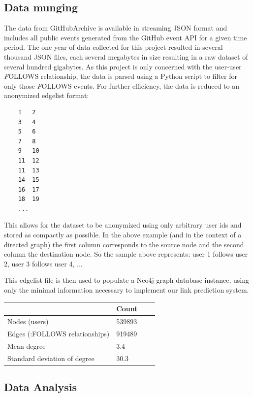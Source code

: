 \subsection{Data munging}
The data from GitHubArchive is available in streaming JSON format and includes all public events generated from the GitHub event API \cite{github:Online} for a given time period. The one year of data collected for this project resulted in several thousand JSON files, each several megabytes in size resulting in a raw dataset of several hundred gigabytes. As this project is only concerned with the user-user {\textit FOLLOWS} relationship, the data is parsed using a Python script to filter for only those {\textit FOLLOWS} events. For further efficiency, the data is reduced to an anonymized edgelist format:
\begin{verbatim}
    1	2
    3	4
    5	6
    7	8
    9	10
    11	12
    11	13
    14	15
    16	17
    18	19
    ...
\end{verbatim}
This allows for the dataset to be anonymized using only arbitrary user ids and stored as compactly as possible. In the above example (and in the context of a directed graph) the first column corresponds to the source node and the second column the destination node. So the sample above represents: user 1 follows user 2, user 3 follows user 4, ...

This edgelist file is then used to populate a Neo4j graph database instance, using only the minimal information necessary to implement our link prediction system. 

\begin{table}[ht]
\centering
\small\renewcommand{\arraystretch}{1.4}  
%
\label{follow_pagerank_table}
\begin{tabularx}{0.7\textwidth}{lXXX}
\hline
\rowcolor{tableheadcolor}
 & Count \\
\hline
Nodes (users) & 539893  \\
Edges (:FOLLOWS relationships) & 919489 \\
Mean degree & 3.4 \\
Standard deviation of degree & 30.3 \\
\hline
\hline
\end{tabularx}
\end{table}


\subsection{Data Analysis}

